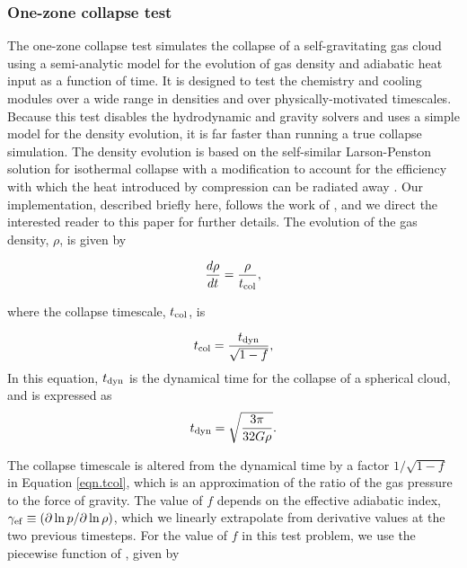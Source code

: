 \subsubsection{One-zone collapse test}
\label{sec.tests.1-zone}

The one-zone collapse test simulates the collapse of a
self-gravitating gas cloud using a semi-analytic model for the
evolution of gas density and adiabatic heat input as a function of
time.  It is designed to test the chemistry and cooling modules over a
wide range in densities and over physically-motivated timescales.
Because this test disables the hydrodynamic and gravity solvers and
uses a simple model for the density evolution, it is far faster than
running a true collapse simulation.  The density evolution is based on
the self-similar Larson-Penston solution for isothermal collapse \citep{1969MNRAS.145..271L,
1969MNRAS.144..425P} with a
modification to account for the efficiency with which the heat
introduced by compression can be radiated away
\citep{1983ApJ...265.1047Y}.  Our implementation, described briefly
here, follows the work of \citet{2005ApJ...626..627O}, and we direct
the interested reader to this paper for further details.  The
evolution of the gas density, $\rho$, is given by

\begin{equation}
\frac{d\rho}{dt} = \frac{\rho}{t_{\rm col}},
\end{equation}

where the collapse timescale, $t_{\rm col}$, is

\begin{equation} \label{eqn.tcol}
t_{\rm col} = \frac{t_{\rm dyn}}{\sqrt{1 - f}},
\end{equation}
In this equation, $t_{\rm dyn}$ is the dynamical time for the collapse
of a spherical cloud, and is expressed as
\begin{equation}
t_{\rm dyn} = \sqrt{\frac{3 \pi}{32 G \rho}}.
\end{equation}

 The collapse timescale is altered from the dynamical time by a factor
$1/\sqrt{1-f}$ in Equation
\ref{eqn.tcol}, which is an approximation of the ratio of the gas
pressure to the force of gravity.  The value of $f$ depends on the
effective adiabatic index, $\gamma_{\rm ef} \equiv (\partial \ln p
/ \partial \ln \rho)$, which we linearly extrapolate
from derivative values at the two previous timesteps.  For the value
of $f$ in this test problem, we use the piecewise function of
\citet{2005ApJ...626..627O}, given by

